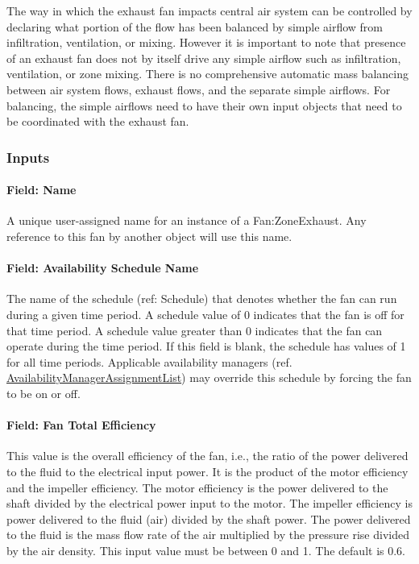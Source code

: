 The way in which the exhaust fan impacts central air system can be controlled by declaring what portion of the flow has been balanced by simple airflow from infiltration, ventilation, or mixing. However it is important to note that presence of an exhaust fan does not by itself drive any simple airflow such as infiltration, ventilation, or zone mixing. There is no comprehensive automatic mass balancing between air system flows, exhaust flows, and the separate simple airflows. For balancing, the simple airflows need to have their own input objects that need to be coordinated with the exhaust fan.

\subsubsection{Inputs}\label{inputs-3-014}

\paragraph{Field: Name}\label{field-name-3-013}

A unique user-assigned name for an instance of a Fan:ZoneExhaust. Any reference to this fan by another object will use this name.

\paragraph{Field: Availability Schedule Name}\label{field-availability-schedule-name-3-002}

The name of the schedule (ref: Schedule) that denotes whether the fan can run during a given time period. A schedule value of 0 indicates that the fan is off for that time period. A schedule value greater than 0 indicates that the fan can operate during the time period. If this field is blank, the schedule has values of 1 for all time periods. Applicable availability managers (ref. \hyperref[availabilitymanagerassignmentlist]{AvailabilityManagerAssignmentList}) may override this schedule by forcing the fan to be on or off.

\paragraph{Field: Fan Total Efficiency}\label{field-fan-total-efficiency-3}

This value is the overall efficiency of the fan, i.e., the ratio of the power delivered to the fluid to the electrical input power. It is the product of the motor efficiency and the impeller efficiency. The motor efficiency is the power delivered to the shaft divided by the electrical power input to the motor. The impeller efficiency is power delivered to the fluid (air) divided by the shaft power. The power delivered to the fluid is the mass flow rate of the air multiplied by the pressure rise divided by the air density. This input value must be between 0 and 1. The default is 0.6.

